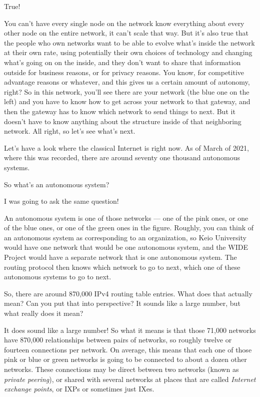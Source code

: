 \mmm True!

\rrr You can't have every single node on the network know everything about every other node on the entire network, it can't scale that way. But it's also true that the people who own networks want to be able to evolve what's inside the network at their own rate, using potentially their own choices of technology and changing what's going on on the inside, and they don't want to share that information outside for business reasons, or for privacy reasons. You know, for competitive advantage reasons or whatever, and this gives us a certain amount of autonomy, right? So in this network, you'll see there are your network (the blue one on the left) and you have to know how to get across your network to that gateway, and then the gateway has to know which network to send things to next. But it doesn't have to know anything about the structure inside of that neighboring network. All right, so let's see what's next.

\mmm Let's have a look where the classical Internet is right now. As of March of 2021, where this was recorded, there are around seventy one thousand autonomous systems.

\rrr So what's an autonomous system?

\mmm I was going to ask the same question!

\rrr An autonomous system is one of those networks --- one of the pink ones, or one of the blue ones, or one of the green ones in the figure. Roughly, you can think of an autonomous system as corresponding to an organization, so Keio University would have one network that would be one autonomous system, and the WIDE Project would have a separate network that is one autonomous system. The routing protocol then knows which network to go to next, which one of these autonomous systems to go to next.

\mmm So, there are around 870,000 IPv4 routing table entries. What does that actually mean? Can you put that into perspective? It sounds like a large number, but what really does it mean?

\rrr It does sound like a large number! So what it means is that those 71,000 networks have 870,000 relationships between pairs of networks, so roughly twelve or fourteen connections per network. On average, this means that each one of those pink or blue or green networks is going to be connected to about a dozen other networks. These connections may be direct between two networks (known as \emph{private peering}), or shared with several networks at places that are called \emph{Internet exchange points}, or IXPs or sometimes just IXes.

